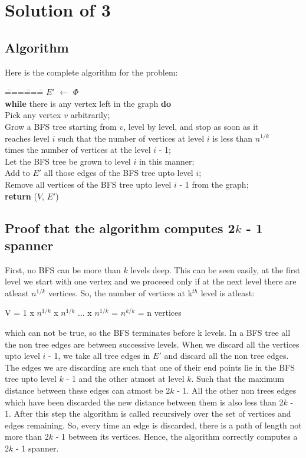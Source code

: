 \documentclass[a4paper,10pt]{article}
\title{}
\author{}
\begin{document}
\maketitle

\section{Solution of 3}
\subsection{Algorithm}
Here is the complete algorithm for the problem:
\begin{tabbing}
\====\====\=\kill
 $E'$ $\leftarrow$ $\Phi$\\
 {\bf while} there is any vertex left in the graph {\bf do}\\
 \>\>Pick any vertex $v$ arbitrarily;\\
 \>\>Grow a BFS tree starting from $v$, level by level, and stop as soon as it\\
 \>\>reaches level $i$ such that the number of vertices at level $i$ is less than $n^{1/k}$\\
 \>\>times the number of vertices at the level $i$ - 1;\\
 \>\>Let the BFS tree be grown to level $i$ in this manner;\\
 \>\>Add to $E'$ all those edges of the BFS tree upto level $i$;\\
 \>\>Remove all vertices of the BFS tree upto level $i$ - 1 from the graph;\\
 {\bf return} ($V$, $E'$)\\
\end{tabbing}

\subsection{Proof that the algorithm computes 2$k$ - 1 spanner}
First, no BFS can be more than $k$ levels deep. This can be seen easily, at the first level we start
with one vertex and we proceeed only if at the next level there are atleast $n^{1/k}$ vertices. So, the number
of vertices at k$^{th}$ level is atleast:
\begin{center}
 V = 1 x $n^{1/k}$ x $n^{1/k}$ ... x $n^{1/k}$ = $n^{k/k}$ = n vertices
\end{center}
which can not be true, so the BFS terminates before k levels.
In a BFS tree all the non tree edges are between successive levels.
When we discard all the vertices upto level $i$ - 1, we take all 
tree edges in $E'$ and discard all the non tree edges. The edges we are discarding 
are such that one of their end points lie in the BFS tree upto level $k$ - 1 and the 
other atmost at level $k$. Such that the maximum distance between these edges can atmost be
2$k$ - 1. All the other non trees edges which have been discarded the new distance between them
is also less than 2$k$ - 1. After this step the algorithm is called recursively over the set of vertices
and edges remaining. So, every time an edge is discarded, there is a path of length not more than 
2$k$ - 1 between its vertices. Hence, the algorithm correctly computes a 2$k$ - 1 spanner.
\end{document}
